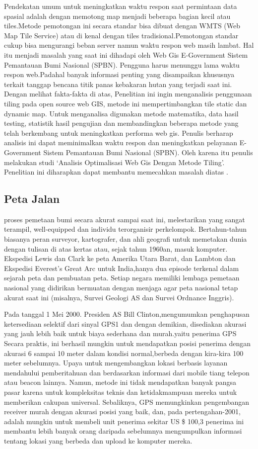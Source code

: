 Pendekatan umum untuk meningkatkan waktu respon saat permintaan data spasial adalah dengan memotong map 
menjadi beberapa bagian kecil atau tiles.Metode pemotongan ini secara standar bisa dibuat dengan WMTS (Web Map Tile Service) atau di 
kenal dengan tiles tradisional.Pemotongan standar cukup bisa mengurangi beban server namun waktu respon web masih lambat. Hal itu 
menjadi masalah yang saat ini dihadapi oleh Web Gis E-Government Sistem Pemantauan Bumi Nasional (SPBN). Pengguna harus menunggu lama 
waktu respon web.Padahal banyak informasi penting yang disampaikan khususnya terkait tanggap bencana titik panas kebakaran hutan yang 
terjadi saat ini. Dengan melihat fakta-fakta di atas, Penelitian ini ingin menganalisis penggunaan tiling pada open source web GIS, 
metode ini mempertimbangkan tile static dan dynamic map. Untuk menganalisa digunakan metode matematika, data hasil testing, statistik 
hasil pengujian dan membandingkan beberapa metode yang telah berkembang untuk meningkatkan performa web gis. Penulis berharap analisis 
ini dapat meminimalkan waktu respon dan meningkatkan pelayanan E-Government Sistem Pemantauan Bumi Nasional (SPBN). Oleh karena itu 
penulis melakukan studi `Analisis Optimalisasi Web Gis Dengan Metode Tiling'. Penelitian ini diharapkan dapat membantu memecahkan 
masalah diatas \cite{dewioptimalisasi} .

\subsection{Peta Jalan}
proses pemetaan bumi secara akurat sampai saat ini, melestarikan yang sangat terampil, well-equipped dan individu terorganisir
perkelompok. Bertahun-tahun biasanya peran surveyor, kartografer, dan ahli geografi untuk memetakan dunia dengan tulisan di atas kertas
atau, sejak tahun 1960an, masuk komputer. Ekspedisi Lewis dan Clark ke peta Amerika Utara Barat, dan Lambton dan Ekspedisi Everest's
Great Arc untuk India,hanya dua episode terkenal dalam sejarah peta dan pembuatan peta. Setiap negara memiliki lembaga pemetaan nasional
yang didirikan bermuatan dengan menjaga agar peta nasional tetap akurat saat ini (misalnya, Survei Geologi AS dan Survei Ordnance
Inggris).

Pada tanggal 1 Mei 2000. Presiden AS Bill Clinton,mengumumkan penghapusan ketersediaan selektif dari sinyal GPS1 dan dengan demikian,
disediakan akurasi yang jauh lebih baik untuk biaya sederhana dan murah.yaitu penerima GPS Secara praktis, ini berhasil mungkin untuk
mendapatkan posisi penerima dengan akurasi 6 sampai 10 meter dalam kondisi normal,berbeda dengan kira-kira 100 meter sebelumnya. Upaya
untuk mengembangkan lokasi berbasis layanan mendahului pemberitahuan dan berdasarkan informasi dari mobile tiang telepon atau beacon
lainnya. Namun, metode ini tidak mendapatkan banyak pangsa pasar karena untuk kompleksitas teknis dan ketidakmampuan mereka untuk
memberikan cakupan universal. Sebaliknya, GPS memungkinkan pengembangan receiver murah dengan akurasi posisi yang baik, dan, pada
pertengahan-2001, adalah mungkin untuk membeli unit penerima sekitar US \$ 100,3 penerima ini membantu lebih banyak orang daripada
sebelumnya mengumpulkan informasi tentang lokasi yang berbeda dan upload ke komputer mereka.

